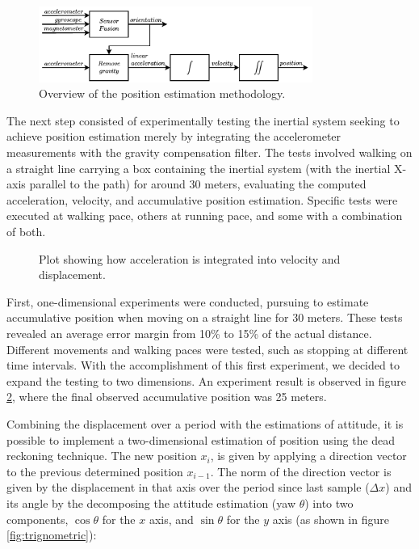\begin{figure}[!h]
  \centering
  \includegraphics[width=0.8\textwidth]{figures/orientation_position.pdf}
  \caption{Overview of the position estimation methodology.}
  \label{fig:position_overview}
\end{figure}

The next step consisted of experimentally testing the inertial system seeking to achieve position estimation merely by integrating the accelerometer measurements with the gravity compensation filter. The tests involved walking on a straight line carrying a box containing the inertial system (with the inertial X-axis parallel to the path) for around 30 meters, evaluating the computed acceleration, velocity, and accumulative position estimation. Specific tests were executed at walking pace, others at running pace, and some with a combination of both.

\begin{figure}[!h]
  \centering
  \resizebox{0.8\linewidth}{!}{}
  \caption{ Plot showing how acceleration is integrated into velocity and displacement. }
  \label{fig:integration}
\end{figure}

First, one-dimensional experiments were conducted, pursuing to estimate accumulative position when moving on a straight line for 30 meters. These tests revealed an average error margin from 10\% to 15\% of the actual distance. Different movements and walking paces were tested, such as stopping at different time intervals. With the accomplishment of this first experiment, we decided to expand the testing to two dimensions. An experiment result is observed in figure \ref{fig:integration}, where the final observed accumulative position was 25 meters.

Combining the displacement over a period with the estimations of attitude, it is possible to implement a two-dimensional estimation of position using the dead reckoning technique. The new position $x_i$, is given by applying a direction vector to the previous determined position $x_{i-1}$. The norm of the direction vector is given by the displacement in that axis over the period since last sample ($\Delta x$) and its angle by the decomposing the attitude estimation (yaw $\theta$) into two components, $\cos \theta$ for the $x$ axis, and $\sin \theta$ for the $y$ axis (as shown in figure \ref{fig:trignometric}):

